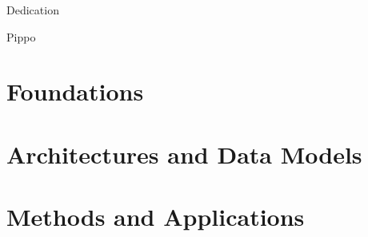 \documentclass[12pt,a4paper,openright,twoside]{book}
\begin{document}
	
\frontmatter


\begin{abstract}
Max 2000 characters, strict.
\end{abstract}

\begin{dedication} %
Dedication
\end{dedication}

\begin{acknowledgements} %
Pippo
\end{acknowledgements}

\tableofcontents   
\listoffigures     %
\lstlistoflistings %

\mainmatter

\begin{introduction}
\label{chap:introduction}

\end{introduction}

%


\part{Foundations}
\label{part:foundations}






\part{Architectures and Data Models}
\label{part:architectures}



\part{Methods and Applications}
\label{part:methods-applications}

\end{document}
